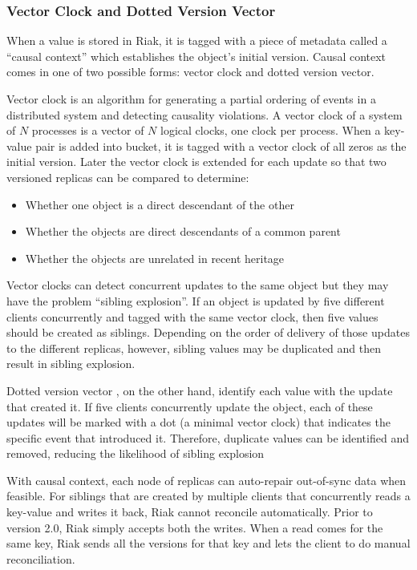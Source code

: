 \documentclass[11pt]{book}
\begin{document}
\subsubsection{Vector Clock and Dotted Version Vector}
When a value is stored in Riak, it is tagged with a piece of metadata called a ``causal context'' which establishes the object's initial version. Causal context comes in one of two possible forms: vector clock and dotted version vector.

Vector clock \cite{fidge1988timestamps, Mattern89virtualtime} is an algorithm for generating a partial ordering of events in a distributed system and detecting causality violations. A vector clock of a system of $N$ processes is a vector of $N$ logical clocks, one clock per process. When a key-value pair is added into bucket, it is tagged with a vector clock of all zeros as the initial version. Later the vector clock is extended for each update so that two versioned replicas can be compared to determine:
\begin{itemize}
\item Whether one object is a direct descendant of the other
\item Whether the objects are direct descendants of a common parent
\item Whether the objects are unrelated in recent heritage
\end{itemize}

Vector clocks can detect concurrent updates to the same object but they may have the problem ``sibling explosion''. If an object is updated by five different clients concurrently and tagged with the same vector clock, then five values should be created as siblings. Depending on the order of delivery of those updates to the different replicas, however, sibling values may be duplicated and then result in sibling explosion.

Dotted version vector \cite{Preguica:2012:BAE}, on the other hand, identify each value with the update that created it. If five clients concurrently update the object, each of these updates will be marked with a dot (a minimal vector clock) that indicates the specific event that introduced it. Therefore, duplicate values can be identified and removed, reducing the likelihood of sibling explosion

With causal context, each node of replicas can auto-repair out-of-sync data when feasible. For siblings that are created by multiple clients that concurrently reads a key-value and writes it back, Riak cannot reconcile automatically. Prior to version 2.0, Riak simply accepts both the writes. When a read comes for the same key, Riak sends all the versions for that key and lets the client to do manual reconciliation.
\end{document}
